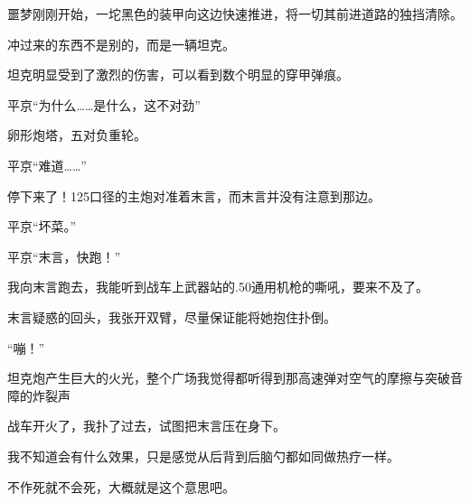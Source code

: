 噩梦刚刚开始，一坨黑色的装甲向这边快速推进，将一切其前进道路的独挡清除。

冲过来的东西不是别的，而是一辆坦克。

坦克明显受到了激烈的伤害，可以看到数个明显的穿甲弹痕。

平京“为什么……是什么，这不对劲”

卵形炮塔，五对负重轮。

平京“难道……”

停下来了！125口径的主炮对准着末言，而末言并没有注意到那边。

平京“坏菜。”

平京“末言，快跑！”

我向末言跑去，我能听到战车上武器站的.50通用机枪的嘶吼，要来不及了。

末言疑惑的回头，我张开双臂，尽量保证能将她抱住扑倒。

“嘣！”

坦克炮产生巨大的火光，整个广场我觉得都听得到那高速弹对空气的摩擦与突破音障的炸裂声

战车开火了，我扑了过去，试图把末言压在身下。

我不知道会有什么效果，只是感觉从后背到后脑勺都如同做热疗一样。

不作死就不会死，大概就是这个意思吧。














